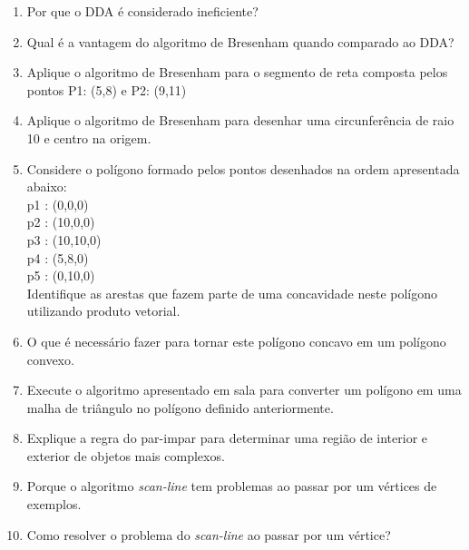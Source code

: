 \documentclass[12pt,a4paper]{article}
\begin{document}
\begin{enumerate}
	\item Por que o DDA é considerado ineficiente?
	
	\item Qual é a vantagem do algoritmo de Bresenham quando comparado ao DDA?
	
	\item Aplique o algoritmo de Bresenham para o segmento de reta composta pelos pontos P1: (5,8) e P2: (9,11)
	
	\item Aplique o algoritmo de Bresenham para desenhar uma circunferência de raio 10 e centro na origem.
	
	\item Considere o polígono formado pelos pontos desenhados na ordem apresentada abaixo:\\
	
		p1 : (0,0,0)\\
		p2 : (10,0,0)\\
		p3 : (10,10,0)\\
		p4 : (5,8,0)\\
		p5 : (0,10,0)\\

		Identifique as arestas que fazem parte de uma concavidade neste polígono
utilizando produto vetorial.

	\item O que é necessário fazer para tornar este polígono concavo em um polígono
convexo.

	\item Execute o algoritmo apresentado em sala para converter um polígono em
uma malha de triângulo no polígono definido anteriormente.

	\item Explique a regra do par-impar para determinar uma região de interior e
exterior de objetos mais complexos.

	\item Porque o algoritmo \textit{scan-line} tem problemas ao passar por um vértices de exemplos.
	
	\item Como resolver o problema do \textit{scan-line} ao passar por um vértice?

\end{enumerate}
\end{document}
